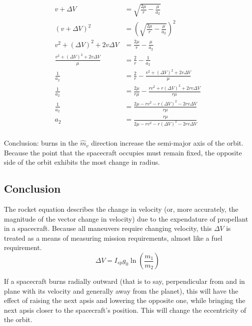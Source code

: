 \documentclass{article}
\begin{document}
\begin{align*}
    v + \Delta V                            & = \sqrt{\frac{2\mu}{r}-\frac{\mu}{a_2}}                        \\
    (v + \Delta V)^2                        & = \left(\sqrt{\frac{2\mu}{r}-\frac{\mu}{a_2}}\right)^2         \\
    v^2 + (\Delta V)^2 + 2v\Delta V         & = \frac{2\mu}{r}-\frac{\mu}{a_2}                               \\
    \frac{v^2+(\Delta V)^2+2v\Delta V}{\mu} & =\frac{2}{r}-\frac{1}{a_2}                                     \\
    \frac{1}{a_2}                           & =\frac{2}{r}-\frac{v^2+(\Delta V)^2+2v\Delta V}{\mu}           \\
    \frac{1}{a_2}                           & =\frac{2\mu}{r\mu}-\frac{rv^2+r(\Delta V)^2+2rv\Delta V}{r\mu} \\
    \frac{1}{a_2}                           & =\frac{2\mu-rv^2-r(\Delta V)^2-2rv\Delta V}{r\mu}              \\
    {a_2}                                   & =\frac{r\mu}{2\mu-rv^2-r(\Delta V)^2-2rv\Delta V}              \\
\end{align*}

Conclusion: burns in the $\hat{m}_v$ direction increase the semi-major axis of the orbit. Because the point that the spacecraft occupies must remain fixed, the opposite side of the orbit exhibits the most change in radius.

\subsection{Conclusion}

\bigskip
The rocket equation describes the change in velocity (or, more accurately, the magnitude of the vector change in velocity) due to the expendature of propellant in a spacecraft. Because all maneuvers require changing velocity, this $\Delta V$ is treated as a means of measuring mission requirements, almost like a fuel requirement.
$$\Delta V = I_{sp}g_0\ln\left(\frac{m_1}{m_2}\right)$$

\bigskip
If a spacecraft burns radially outward (that is to say, perpendicular from and in plane with its velocity and generally away from the planet), this will have the effect of raising the next apsis and lowering the opposite one, while bringing the next apsis closer to the spacecraft's position. This will change the eccentricity of the orbit.
\end{document}
